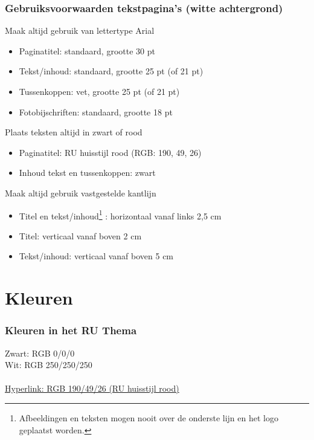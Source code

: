 \documentclass[showdate=true, slidenumbers=relative]{beamerruhuisstijl169}
\begin{document}
\begin{frame}
    \frametitle{Gebruiksvoorwaarden tekstpagina's (witte achtergrond)}

    \begin{block}{Maak altijd gebruik van lettertype Arial}
        \begin{itemize}
            \item Paginatitel: standaard, grootte 30 pt
            \item Tekst/inhoud: standaard, grootte 25 pt (of 21 pt)
            \item Tussenkoppen: vet, grootte 25 pt (of 21 pt)
            \item Fotobijschriften: standaard, grootte 18 pt
        \end{itemize}
    \end{block}

    \begin{block}{Plaats teksten altijd in zwart of rood}
        \begin{itemize}
            \item Paginatitel: RU huisstijl rood {\color{ruhuisstijlrood} (RGB: 190, 49, 26)}
            \item Inhoud tekst en tussenkoppen: zwart
        \end{itemize}
    \end{block}

    \begin{block}{Maak altijd gebruik vastgestelde kantlijn}
        \begin{itemize}
            \item Titel en tekst/inhoud\footnote{Afbeeldingen en teksten mogen nooit over de onderste lijn en het logo geplaatst worden.}
            : horizontaal vanaf links 2,5 cm
            \item Titel: verticaal vanaf boven 2 cm
            \item Tekst/inhoud: verticaal vanaf boven 5 cm
        \end{itemize}
    \end{block}

\end{frame}

\section{Kleuren}
\begin{frame}
    \frametitle{Kleuren in het RU Thema}

    Zwart: RGB 0/0/0 \\
    Wit: RGB 250/250/250 \\
     \\
    \href{http://google.com/}{Hyperlink: RGB 190/49/26 (RU huisstijl rood)}
\end{frame}
\end{document}
